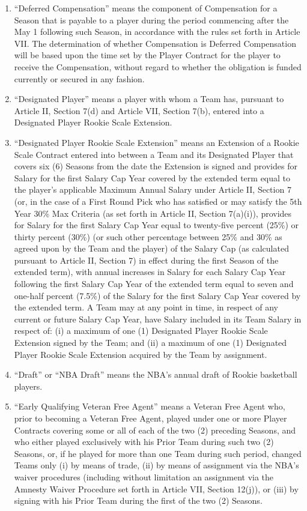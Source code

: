 \documentclass[
]{book}
\begin{document}
\begin{enumerate}
\item
  ``Deferred Compensation'' means the component of Compensation for a Season that is payable to a player during the period commencing after the May 1 following such Season, in accordance with the rules set forth in Article VII. The determination of whether Compensation is Deferred Compensation will be based upon the time set by the Player Contract for the player to receive the Compensation, without regard to whether the obligation is funded currently or secured in any fashion.
\item
  ``Designated Player'' means a player with whom a Team has, pursuant to Article II, Section 7(d) and Article VII, Section 7(b), entered into a Designated Player Rookie Scale Extension.
\item
  ``Designated Player Rookie Scale Extension'' means an Extension of a Rookie Scale Contract entered into between a Team and its Designated Player that covers six (6) Seasons from the date the Extension is signed and provides for Salary for the first Salary Cap Year covered by the extended term equal to the player's applicable Maximum Annual Salary under Article II, Section 7 (or, in the case of a First Round Pick who has satisfied or may satisfy the 5th Year 30\% Max Criteria (as set forth in Article II, Section 7(a)(i)), provides for Salary for the first Salary Cap Year equal to twenty-five percent (25\%) or thirty percent (30\%) (or such other percentage between 25\% and 30\% as agreed upon by the Team and the player) of the Salary Cap (as calculated pursuant to Article II, Section 7) in effect during the first Season of the extended term), with annual increases in Salary for each Salary Cap Year following the first Salary Cap Year of the extended term equal to seven and one-half percent (7.5\%) of the Salary for the first Salary Cap Year covered by the extended term. A Team may at any point in time, in respect of any current or future Salary Cap Year, have Salary included in its Team Salary in respect of: (i) a maximum of one (1) Designated Player Rookie Scale Extension signed by the Team; and (ii) a maximum of one (1) Designated Player Rookie Scale Extension acquired by the Team by assignment.
\item
  ``Draft'' or ``NBA Draft'' means the NBA's annual draft of Rookie basketball players.
\item
  ``Early Qualifying Veteran Free Agent'' means a Veteran Free Agent who, prior to becoming a Veteran Free Agent, played under one or more Player Contracts covering some or all of each of the two (2) preceding Seasons, and who either played exclusively with his Prior Team during such two (2) Seasons, or, if he played for more than one Team during such period, changed Teams only (i) by means of trade, (ii) by means of assignment via the NBA's waiver procedures (including without limitation an assignment via the Amnesty Waiver Procedure set forth in Article VII, Section 12(j)), or (iii) by signing with his Prior Team during the first of the two (2) Seasons.

\end{enumerate}
\end{document}
